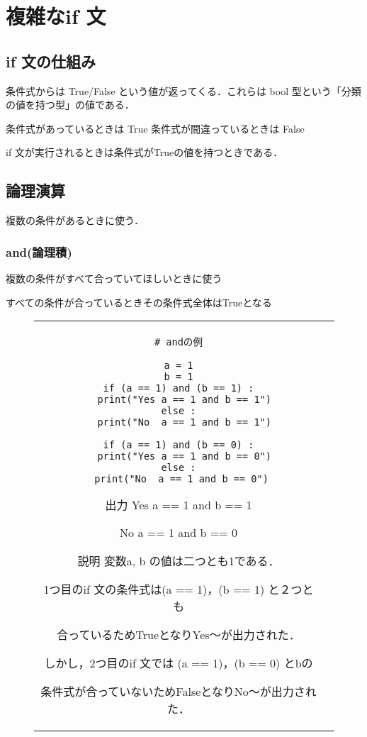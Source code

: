\documentclass{jsarticle}
\begin{document}
\section{複雑なif 文}
\subsection{if 文の仕組み}
条件式からは True/False という値が返ってくる．これらは bool 型という「分類の値を持つ型」の値である． \par
条件式があっているときは True
条件式が間違っているときは False \par
if 文が実行されるときは条件式がTrueの値を持つときである．
\subsection{論理演算}
複数の条件があるときに使う．
\subsubsection{and(論理積)}
複数の条件がすべて合っていてほしいときに使う \par
すべての条件が合っているときその条件式全体はTrueとなる
\vspace{-5mm}
\begin{figure}[h]
	\begin{tabular}{cc}
		\begin{minipage}[t]{.4\textwidth}
			\begin{lstlisting}[caption=and]
# andの例

a = 1
b = 1
if (a == 1) and (b == 1) :
  print("Yes a == 1 and b == 1")
else :
  print("No  a == 1 and b == 1")

if (a == 1) and (b == 0) :
  print("Yes a == 1 and b == 0")
else :
  print("No  a == 1 and b == 0") \end{lstlisting}
		\end{minipage} \hspace{5mm}
		\begin{minipage}[t]{.6\textwidth}
			\begin{minipage}[t]{.5\textwidth}
				\begin{itembox}[l]{出力}
					Yes a == 1 and b == 1 \par
					No\; a == 1 and b == 0 \par
				\end{itembox}
			\end{minipage}
			\begin{itembox}[l]{説明}
				変数a, b の値は二つとも1である． \par
				1つ目のif 文の条件式は(a == 1)，(b == 1) と２つとも \par 合っているためTrueとなりYes～が出力された． \par
				しかし，2つ目のif 文では (a == 1)，(b == 0) とbの \par 条件式が合っていないためFalseとなりNo～が出力された． \par
			\end{itembox}

		\end{minipage} \hspace{5mm}
	\end{tabular}
\end{figure}
\newpage
\end{document}
